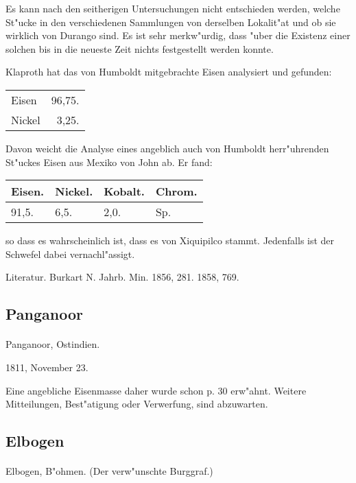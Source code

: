 \documentclass[a4paper, 11pt, oneside]{article}
\begin{document}
Es kann nach den seitherigen Untersuchungen nicht entschieden werden, welche St"ucke in den verschiedenen Sammlungen von derselben Lokalit"at und ob sie wirklich von Durango sind. Es ist sehr merkw"urdig, dass "uber die Existenz einer solchen bis in die neueste Zeit nichts festgestellt werden konnte.

Klaproth hat das von Humboldt mitgebrachte Eisen analysiert und gefunden:
\begin{table}[H]
    \centering
    \begin{tabular}{l r}
        Eisen & 96,75. \\
        Nickel & 3,25. \\
    \end{tabular}
\end{table}

Davon weicht die Analyse eines angeblich auch von Humboldt herr"uhrenden St"uckes Eisen aus Mexiko von John ab. Er fand:
\begin{table}[H]
    \centering
    \begin{tabular}{l l l l}
        Eisen. & Nickel. & Kobalt. & Chrom. \\ \hline
        91,5. & 6,5. & 2,0. & Sp. \\
    \end{tabular}
\end{table}

so dass es wahrscheinlich ist, dass es von Xiquipilco stammt. Jedenfalls ist der Schwefel dabei vernachl"assigt.

\footnotesize
Literatur. Burkart N. Jahrb. Min. 1856, 281. 1858, 769.

\subsection{Panganoor}
\normalsize
\paragraph{}
Panganoor, Ostindien.

1811, November 23.

Eine angebliche Eisenmasse daher wurde schon p. 30 erw"ahnt.
Weitere Mitteilungen, Best"atigung oder Verwerfung, sind abzuwarten.

\subsection{Elbogen}
\normalsize
\paragraph{}
Elbogen, B"ohmen. (Der verw"unschte Burggraf.)
\end{document}
